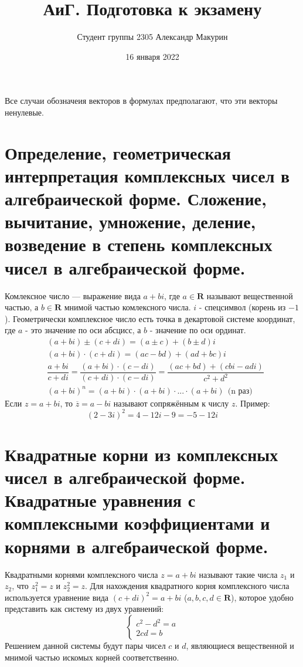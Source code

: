 \documentclass[12pt]{article}
\title{АиГ. Подготовка к экзамену}
\author{Студент группы 2305 Александр Макурин}
\date{16 января 2022}
\begin{document}
\newcommand{\limx}{\displaystyle\lim_{x \rightarrow x_0}}
\newcommand{\overo}{\overline{o}}
\newcommand{\ol}[1]{\overrightarrow{#1}}

\maketitle

\begin{sloppypar}

    Все случаи обозначеия векторов в формулах предполагают, что эти векторы ненулевые.

    \section{Определение, геометрическая интерпретация комплексных чисел в алгебраической форме. Сложение, вычитание, умножение, деление, возведение в степень комплексных чисел в алгебраической форме.}
    Комлексное число — выражение вида $a + bi$, где $a \in \mathbf{R}$ называют вещественной частью, а $b \in \mathbf{R}$ мнимой частью комлексного числа. $i$ - спецсимвол (корень из $-1$).
    Геометрически комплексное число есть точка в декартовой системе координат, где $a$ - это значение по оси абсцисс, а $b$ - значение по оси ординат.
    \begin{align*}
         & (a + bi) \pm (c + di) = (a \pm c) + (b \pm d)i                                                                                 \\
         & (a + bi) \cdot (c + di) = (ac - bd) + (ad + bc)i                                                                               \\
         & \dfrac{a + bi}{c + di} = \dfrac{(a + bi) \cdot (c - di)}{(c + di) \cdot (c - di)} = \dfrac{(ac + bd) + (cbi - adi)}{c^2 + d^2} \\
         & (a + bi)^n = (a + bi) \cdot (a + bi) \cdot ... \cdot (a + bi) \ \  \text{(n раз)}
    \end{align*}
    Если $z = a + bi$, то $\overline{z} = a - bi$ называют сопряжённым к числу $z$.
    Пример:
    \[
        (2 - 3i)^2 = 4 - 12i - 9 = -5 - 12i
    \]
    \section{Квадратные корни из комплексных чисел в алгебраической форме. Квадратные уравнения с комплексными коэффициентами и корнями в алгебраической форме.}
    Квадратными корнями комплексного числа $z = a + bi$ называют такие числа $z_1$ и $z_2$, что $z_1^2 = z$ и $z_2^2 = z$. Для нахождения квадратного корня комплексного числа используется уравнение вида $(c + di)^2 = a + bi$ ($a, b, c, d \in \mathbf{R}$), которое удобно представить как систему из двух уравнений:
    \[
        \begin{cases}
            c^2 - d^2 = a \\
            2cd = b
        \end{cases}
    \]
    Решением данной системы будут пары чисел $c$ и $d$, являющиеся вещественной и мнимой частью искомых корней соответственно.


\end{sloppypar}
\end{document}
